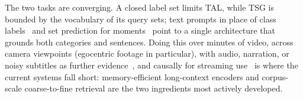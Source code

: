 The two tasks are converging. A closed label set limits TAL, while TSG is bounded by the vocabulary of its query sets; text prompts in place of class labels~\cite{liberatori2024t3al} and set prediction for moments~\cite{lei2021qvhighlights} point to a single architecture that grounds both categories and sentences. Doing this over minutes of video, across camera viewpoints (egocentric footage in particular), with audio, narration, or noisy subtitles as further evidence~\cite{lei2020tvr,lei2021qvhighlights}, and causally for streaming use~\cite{shou2018odas} is where the current systems fall short: memory-efficient long-context encoders and corpus-scale coarse-to-fine retrieval are the two ingredients most actively developed.




